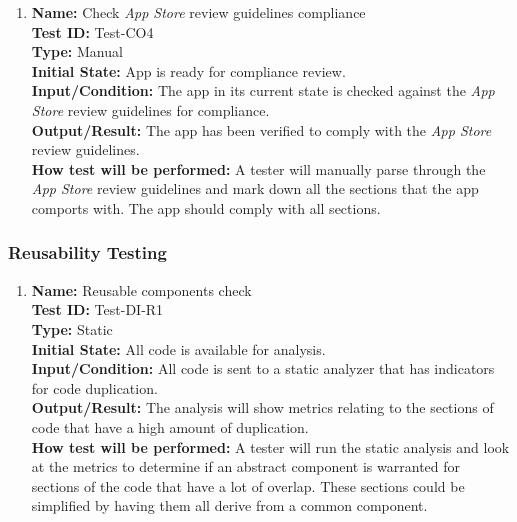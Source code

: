 \documentclass[12pt, titlepage]{article}
\begin{document}
\begin{enumerate}
    \item
    \textbf{Name:} Check \textit{App Store} review guidelines \cite{AppStore} compliance \label{itm:Test-CO4} \\
    \textbf{Test ID:} Test-CO4 \\
    \textbf{Type:} Manual \\
    \textbf{Initial State:} App is ready for compliance review. \\
    \textbf{Input/Condition:} The app in its current state is checked against the \textit{App Store} review guidelines for compliance. \\
    \textbf{Output/Result:} The app has been verified to comply with the \textit{App Store} review guidelines. \\
    \textbf{How test will be performed:} A tester will manually parse through the \textit{App Store} review guidelines and mark down all the sections that the app comports with. The app should comply with all sections.

\end{enumerate}

\subsubsection{Reusability Testing}

\begin{enumerate}

    \item
    \textbf{Name:} Reusable components check \label{itm:Test-DI-R1} \\
    \textbf{Test ID:} Test-DI-R1 \\
    \textbf{Type:} Static \\
    \textbf{Initial State:} All code is available for analysis. \\
    \textbf{Input/Condition:} All code is sent to a static analyzer that has indicators for code duplication. \\
    \textbf{Output/Result:} The analysis will show metrics relating to the sections of code that have a high amount of duplication. \\
    \textbf{How test will be performed:} A tester will run the static analysis and look at the metrics to determine if an abstract component is warranted for sections of the code that have a lot of overlap. These sections could be simplified by having them all derive from a common component.

\end{enumerate}
\end{document}
